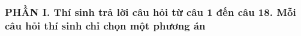 \subsubsection*{PHẦN I. Thí sinh trả lời câu hỏi từ câu 1 đến câu 18. Mỗi câu hỏi thí sinh chỉ chọn một phương án}
\setcounter{ex}{0}
%
